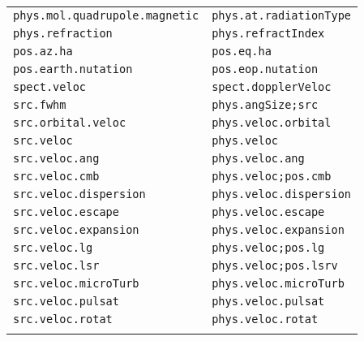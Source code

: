 \documentclass[11pt,a4paper]{ivoa}
\begin{document}
\begin{enumerate}
\begin{longtable}{|l|l|}
{\tt phys.mol.quadrupole.magnetic} & {\tt phys.at.radiationType}\\
{\tt phys.refraction} & {\tt phys.refractIndex}\\
{\tt pos.az.ha} & {\tt pos.eq.ha}\\
{\tt pos.earth.nutation} & {\tt pos.eop.nutation}\\
{\tt spect.veloc} & {\tt spect.dopplerVeloc}\\
{\tt src.fwhm} & {\tt phys.angSize;src}\\
{\tt src.orbital.veloc} & {\tt phys.veloc.orbital}\\
{\tt src.veloc} & {\tt phys.veloc}\\
{\tt src.veloc.ang} & {\tt phys.veloc.ang}\\
{\tt src.veloc.cmb} & {\tt phys.veloc;pos.cmb}\\ 
{\tt src.veloc.dispersion} & {\tt phys.veloc.dispersion}\\
{\tt src.veloc.escape} & {\tt phys.veloc.escape}\\
{\tt src.veloc.expansion} & {\tt phys.veloc.expansion}\\ 
{\tt src.veloc.lg} & {\tt phys.veloc;pos.lg}\\
{\tt src.veloc.lsr} & {\tt phys.veloc;pos.lsrv}\\
{\tt src.veloc.microTurb} & {\tt phys.veloc.microTurb}\\
{\tt src.veloc.pulsat} & {\tt phys.veloc.pulsat}\\
{\tt src.veloc.rotat} & {\tt phys.veloc.rotat}\\
\sptablerule
\end{longtable}


\end{enumerate}
\end{document}

